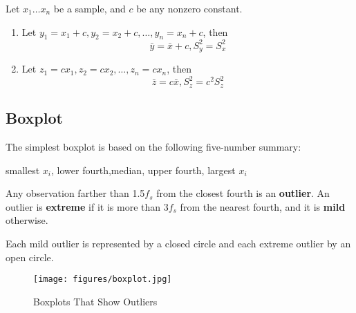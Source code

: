 \begin{prop}
  Let $x_1 \dots x_n$ be a sample, and $c$ be any nonzero constant.
  \begin{enumerate}
    \item Let $y_1=x_1+c,y_2=x_2+c,\dots,y_n=x_n+c$, then
    \[\bar{y}=\bar{x}+c, S_y^2=S_x^2\]
    \item Let $z_1=cx_1,z_2=cx_2,\dots,z_n=cx_n$, then
    \[\bar{z}=c \bar{x}, S_z^2=c^2S_z^2\]
    \end{enumerate}
\end{prop}

\subsection{Boxplot}
The simplest boxplot is based on the following five-number summary:

smallest $x_i$, \quad lower fourth,\quad median, \quad upper fourth, \quad largest $x_i$
\begin{defn}
  Any observation farther than 1.5$f_s$ from the closest fourth is an \textbf{outlier}. An outlier is \textbf{extreme} if it is more than 3$f_s$ from the nearest fourth, and it is \textbf{mild} otherwise.
\end{defn}

Each mild outlier is represented by a closed circle and each extreme outlier by an open circle.

\begin{figure}[H]
\centering
\texttt{[image: figures/boxplot.jpg]}
\caption{Boxplots That Show Outliers}
\label{fig:3}
\end{figure}